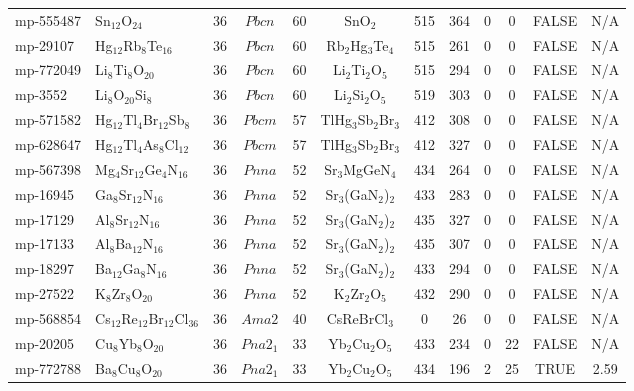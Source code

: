 {\begin{longtable}{llcccccccccc}
    mp-555487 & Sn$_{12}$O$_{24}$ & 36    & $Pbcn$ & 60    & SnO$_{2}$ & 515   & 364   & 0     & 0     & FALSE & N/A \\
    mp-29107 & Hg$_{12}$Rb$_{8}$Te$_{16}$ & 36    & $Pbcn$ & 60    & Rb$_{2}$Hg$_{3}$Te$_{4}$ & 515   & 261   & 0     & 0     & FALSE & N/A \\
    mp-772049 & Li$_{8}$Ti$_{8}$O$_{20}$ & 36    & $Pbcn$ & 60    & Li$_{2}$Ti$_{2}$O$_{5}$ & 515   & 294   & 0     & 0     & FALSE & N/A \\
    mp-3552 & Li$_{8}$O$_{20}$Si$_{8}$ & 36    & $Pbcn$ & 60    & Li$_{2}$Si$_{2}$O$_{5}$ & 519   & 303   & 0     & 0     & FALSE & N/A \\
    mp-571582 & Hg$_{12}$Tl$_{4}$Br$_{12}$Sb$_{8}$ & 36    & $Pbcm$ & 57    & TlHg$_{3}$Sb$_{2}$Br$_{3}$ & 412   & 308   & 0     & 0     & FALSE & N/A \\
    mp-628647 & Hg$_{12}$Tl$_{4}$As$_{8}$Cl$_{12}$ & 36    & $Pbcm$ & 57    & TlHg$_{3}$Sb$_{2}$Br$_{3}$ & 412   & 327   & 0     & 0     & FALSE & N/A \\
    mp-567398 & Mg$_{4}$Sr$_{12}$Ge$_{4}$N$_{16}$ & 36    & $Pnna$ & 52    & Sr$_{3}$MgGeN$_{4}$ & 434   & 264   & 0     & 0     & FALSE & N/A \\
    mp-16945 & Ga$_{8}$Sr$_{12}$N$_{16}$ & 36    & $Pnna$ & 52    & Sr$_{3}$(GaN$_{2}$)$_{2}$ & 433   & 283   & 0     & 0     & FALSE & N/A \\
    mp-17129 & Al$_{8}$Sr$_{12}$N$_{16}$ & 36    & $Pnna$ & 52    & Sr$_{3}$(GaN$_{2}$)$_{2}$ & 435   & 327   & 0     & 0     & FALSE & N/A \\
    mp-17133 & Al$_{8}$Ba$_{12}$N$_{16}$ & 36    & $Pnna$ & 52    & Sr$_{3}$(GaN$_{2}$)$_{2}$ & 435   & 307   & 0     & 0     & FALSE & N/A \\
    mp-18297 & Ba$_{12}$Ga$_{8}$N$_{16}$ & 36    & $Pnna$ & 52    & Sr$_{3}$(GaN$_{2}$)$_{2}$ & 433   & 294   & 0     & 0     & FALSE & N/A \\
    mp-27522 & K$_{8}$Zr$_{8}$O$_{20}$ & 36    & $Pnna$ & 52    & K$_{2}$Zr$_{2}$O$_{5}$ & 432   & 290   & 0     & 0     & FALSE & N/A \\
    mp-568854 & Cs$_{12}$Re$_{12}$Br$_{12}$Cl$_{36}$ & 36    & $Ama2$ & 40    & CsReBrCl$_{3}$ & 0     & 26    & 0     & 0     & FALSE & N/A \\
    mp-20205 & Cu$_{8}$Yb$_{8}$O$_{20}$ & 36    & $Pna2_1$ & 33    & Yb$_{2}$Cu$_{2}$O$_{5}$ & 433   & 234   & 0     & 22    & FALSE & N/A \\
    mp-772788 & Ba$_{8}$Cu$_{8}$O$_{20}$ & 36    & $Pna2_1$ & 33    & Yb$_{2}$Cu$_{2}$O$_{5}$ & 434   & 196   & 2     & 25    & TRUE  & 2.59  \\

\end{longtable}}
